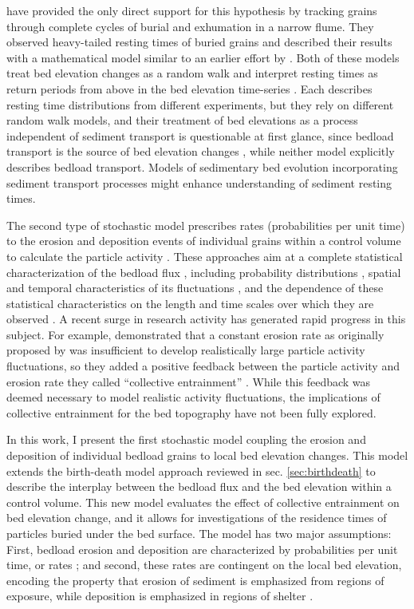 \citet{Martin2014} have provided the only direct support for this hypothesis by tracking grains through complete cycles of burial and exhumation in a narrow flume.
They observed heavy-tailed resting times of buried grains and described their results with a mathematical model similar to an earlier effort by \citet{Voepel2013}.
Both of these models treat bed elevation changes as a random walk and interpret resting times as return periods from above in the bed elevation time-series \citep{Redner2007}.
Each describes resting time distributions from different experiments, but they rely on different random walk models, and their treatment of bed elevations as a process independent of sediment transport is questionable at first glance, since bedload transport is the source of bed elevation changes \citep{Wong2007}, while neither model explicitly describes bedload transport.
Models of sedimentary bed evolution incorporating sediment transport processes might enhance understanding of sediment resting times.

The second type of stochastic model prescribes rates (probabilities per unit time) to the erosion and deposition events of individual grains within a control volume to calculate the particle activity \citep{Einstein1950}.
These approaches aim at a complete statistical characterization of the bedload flux \citep{Furbish2012a,Fathel2015,Furbish2017,Heyman2016}, including probability distributions \citep{Ancey2006,Ancey2008}, spatial and temporal characteristics of its fluctuations \citep{Heyman2014a, Roseberry2012,Dhont2018}, and the dependence of these statistical characteristics on the length and time scales over which they are observed \citep{Singh2009,Singh2012,Saletti2015}.
A recent surge in research activity has generated rapid progress in this subject. 
For example, \citet{Ancey2006} demonstrated that a constant erosion rate as originally proposed by \citet{Einstein1950} was insufficient to develop realistically large particle activity fluctuations, so they added a positive feedback between the particle activity and erosion rate they called ``collective entrainment'' \citep{Ancey2008, Heyman2013,Heyman2014, Lee2018}.
While this feedback was deemed necessary to model realistic activity fluctuations, the implications of collective entrainment for the bed topography have not been fully explored.

In this work, I present the first stochastic model coupling the erosion and deposition of individual bedload grains to local bed elevation changes.
This model extends the birth-death model approach reviewed in sec. \ref{sec:birthdeath} to describe the interplay between the bedload flux and the bed elevation within a control volume.
This new model evaluates the effect of collective entrainment on bed elevation change, and it allows for investigations of the residence times of particles buried under the bed surface.
The model has two major assumptions: First, bedload erosion and deposition are characterized by probabilities per unit time, or rates \citep{Einstein1950, Ancey2008}; and second, these rates are contingent on the local bed elevation, encoding the property that erosion of sediment is emphasized from regions of exposure, while deposition is emphasized in regions of shelter \citep{Sawai1987, Wong2007}.

